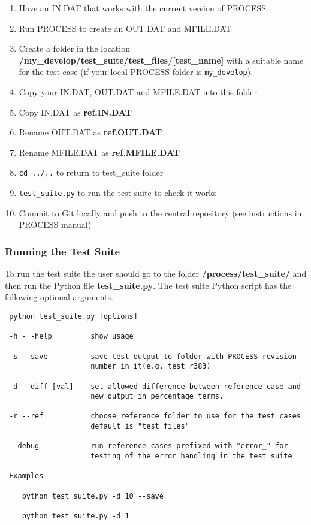 \documentclass[11pt,a4paper]{article}
\begin{document}
\begin{enumerate}
  \item Have an IN.DAT that works with the current version of PROCESS
  \item Run PROCESS to create an OUT.DAT and MFILE.DAT
  \item Create a folder in the location \textbf{/my\_develop/test\_suite/test\_files/[test\_name]} with a suitable name for the test case (if your local PROCESS folder is \texttt{my\_develop}).
  \item Copy your IN.DAT, OUT.DAT and MFILE.DAT into this folder
  \item Copy IN.DAT as \textbf{ref.IN.DAT}
  \item Rename OUT.DAT as \textbf{ref.OUT.DAT}
  \item Rename MFILE.DAT as \textbf{ref.MFILE.DAT}
  \item \texttt{cd ../..}  to return to test\_suite folder
  \item \texttt{test\_suite.py}  to run the test suite to check it works
  \item Commit to Git locally and push to the central repository (see instructions in PROCESS manual)
\end{enumerate}

\subsubsection{Running the Test Suite}

To run the test suite the user should go to the folder \textbf{/process/test\_suite/} and then run the Python file \textbf{test\_suite.py}. The test suite Python script has the following optional arguments.\\
\begin{verbatim}
 python test_suite.py [options]

 -h - -help         show usage

 -s --save          save test output to folder with PROCESS revision
					number in it(e.g. test_r383)

 -d --diff [val]    set allowed difference between reference case and
					new output in percentage terms.

 -r --ref           choose reference folder to use for the test cases
                    default is "test_files"

 --debug            run reference cases prefixed with "error_" for
                    testing of the error handling in the test suite

 Examples

    python test_suite.py -d 10 --save

    python test_suite.py -d 1

\end{verbatim}
\end{document}
